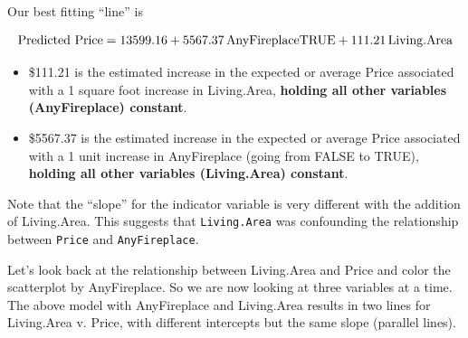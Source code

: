 \documentclass[
]{book}
\newenvironment{Shaded}{\begin{snugshade}}{\end{snugshade}}
\newcommand{\DataTypeTok}[1]{\textcolor[rgb]{0.13,0.29,0.53}{#1}}
\newcommand{\DecValTok}[1]{\textcolor[rgb]{0.00,0.00,0.81}{#1}}
\newcommand{\FloatTok}[1]{\textcolor[rgb]{0.00,0.00,0.81}{#1}}
\newcommand{\KeywordTok}[1]{\textcolor[rgb]{0.13,0.29,0.53}{\textbf{#1}}}
\newcommand{\NormalTok}[1]{#1}
\newcommand{\OperatorTok}[1]{\textcolor[rgb]{0.81,0.36,0.00}{\textbf{#1}}}
\newcommand{\StringTok}[1]{\textcolor[rgb]{0.31,0.60,0.02}{#1}}
\begin{document}
Our best fitting ``line'' is

\[\hbox{Predicted Price} = 13599.16 + 5567.37\,\hbox{AnyFireplaceTRUE} + 111.21\,\hbox{Living.Area}\]

\begin{itemize}
\item
  \$111.21 is the estimated increase in the expected or average Price associated with a 1 square foot increase in Living.Area, \textbf{holding all other variables (AnyFireplace) constant}.
\item
  \$5567.37 is the estimated increase in the expected or average Price associated with a 1 unit increase in AnyFireplace (going from FALSE to TRUE), \textbf{holding all other variables (Living.Area) constant}.
\end{itemize}

Note that the ``slope'' for the indicator variable is very different with the addition of Living.Area. This suggests that \texttt{Living.Area} was confounding the relationship between \texttt{Price} and \texttt{AnyFireplace}.

Let's look back at the relationship between Living.Area and Price and color the scatterplot by AnyFireplace. So we are now looking at three variables at a time. The above model with AnyFireplace and Living.Area results in two lines for Living.Area v. Price, with different intercepts but the same slope (parallel lines).

\begin{Shaded}
\end{Shaded}
\end{document}
